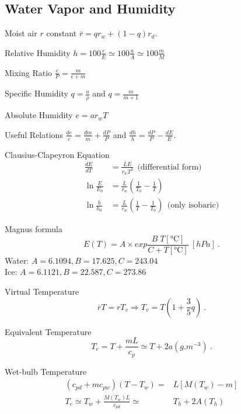 \documentclass[10pt]{article}
\newcommand{\gc}{\degreeCelsius}
\begin{document}
\begin{multicols}{3}
\section{Water Vapor and Humidity}
\begin{ttdesc}[labelwidth=\widthof{\ttfamily{letterpaper/a4paper}}]
\item[Moist air $r$ constant] $\bar r = q r_w + (1-q) r_d$.
\item[Relative Humidity] $h = 100\frac{e}{E}\simeq 100 \frac{a}{A} \simeq 100 \frac{m}{M}$
\item[Mixing Ratio] $\frac e P = \frac m {\epsilon + m}$
\item[Specific Humidity] $q=\frac{a}{\rho}$ and $q=\frac m {m+1}$
\item[Absolute Humidity] $e = a r_w T$
\item[Useful Relations]  $\frac{de}{e}=\frac{dm}{m}+\frac{dP}{P}$ and
 $\frac{dh}{h}=\frac{dP}{P}-\frac{dE}{E}$.
\item[Clausius-Clapeyron Equation]
\begin{align*}
\frac{dE}{dT} &= \frac {L E}{r_w T^2} ~~\text{(differential form)} \\
\ln\frac E {E_0} &= \frac L {r_w} \left(\frac 1 {T_0} - \frac 1 T \right)\\
\ln\frac h {h_0} &= \frac L {r_w} \left(\frac 1 T - \frac 1 {T_0}\right) ~~\text{(only isobaric)}
\end{align*}
\item[Magnus formula] 
\begin{displaymath}
E(T) =  A \times exp{\frac{B\;  T[\si{\gc}]}{C + T[\si{\gc}]}} \ [\si{hPa}] \ .
\end{displaymath}
Water: $A = 6.1094, B = 17.625, C = 243.04$\\
Ice: $A = 6.1121, B = 22.587, C = 273.86$
\item[Virtual Temperature] 
\begin{displaymath}
\overline{r} T= r T_v \Rightarrow T_v=T \left( 1 + \frac 3 5 q \right)~.
\end{displaymath}
\item[Equivalent Temperature] 
\begin{displaymath}
T_e=T+\frac{m L}{c_p} \simeq T + 2 a \left( \si{g.m^{-3}} \right)~.
\end{displaymath}
\item[Wet-bulb Temperature]
\begin{align*} 
  (c_{pd}+m c_{pw}) (T-T_w) =& L [M(T_w)-m] \nonumber \\
T_e \simeq T_w + \frac{M(T_w) L}{c_{pd}} \simeq& T_h + 2 A(T_h)
\end{align*}
\end{ttdesc}
%

\end{multicols}
\end{document}
